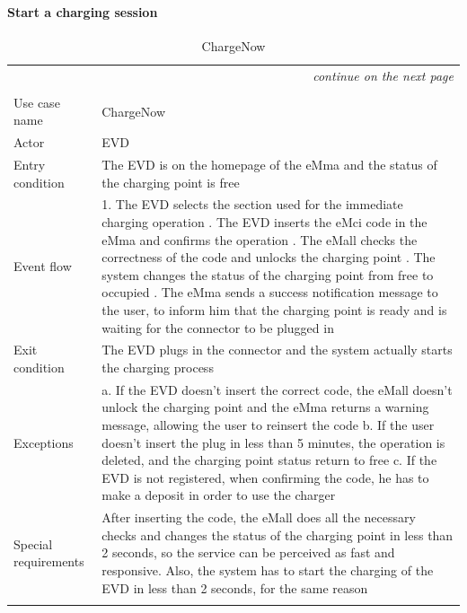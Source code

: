 \clearpage
\paragraph{Start a charging session}
\begin{center}
    \begin{longtable}{p{4cm} p{11cm}}
    \multicolumn{2}{r}{\itshape{continue on the next page}}\\
    \endfoot 
    \\
    \endlastfoot
    \hline
     Use case name &  ChargeNow\\
     \hline
     Actor & EVD \\
     \hline
     Entry condition & The EVD is on the homepage of the eMma and the status of the charging point is free \\
     \hline
     Event flow &   
        1. The EVD selects the section used for the immediate charging operation \newline
        2. The EVD inserts the eMci code in the eMma and confirms the operation \newline
        3. The eMall checks the correctness of the code and unlocks the charging point \newline
        4. The system changes the status of the charging point from free to occupied \newline   
        5. The eMma sends a success notification message to the user, to inform him that the charging point is ready and is waiting for the connector to be plugged in\\
     \hline
     Exit condition &  The EVD plugs in the connector and the system actually starts the charging process \\
     \hline
     Exceptions &   
        a. If the EVD doesn't insert the correct code, the eMall doesn't unlock the charging point and the eMma returns a warning message, allowing the user to reinsert the code\newline
        b. If the user doesn't insert the plug in less than 5 minutes, the operation is deleted, and the charging point status return to free \newline
        c. If the EVD is not registered, when confirming the code, he has to make a deposit in order to use the charger\\ 
     \hline
     Special requirements & After inserting the code, the eMall does all the necessary checks and changes the status of the charging point in less than 2 seconds, so the service can be perceived as fast and responsive. Also, the system has to start the charging of the EVD in less than 2 seconds, for the same reason \\
     \hline
    \caption{ChargeNow}
    \label{tab:ChargeNow}
    \end{longtable}
\end{center}

